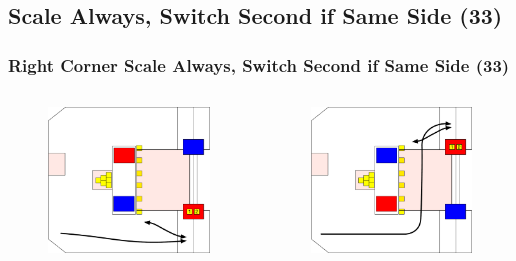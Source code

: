 \documentclass{beamer}
\begin{document}
\subsection{Scale Always, Switch Second if Same Side (33)}

\begin{frame}
 \frametitle{Right Corner Scale Always, Switch Second if Same Side \alert{(33)}}
 \begin{columns}
  \begin{figure}
   \includegraphics[scale=0.15]{assets/paths/33_LR}
  \end{figure}
  \begin{figure}
   \includegraphics[scale=0.15]{assets/paths/33_RL}

\end{figure}
\end{columns}
\end{frame}
\end{document}

